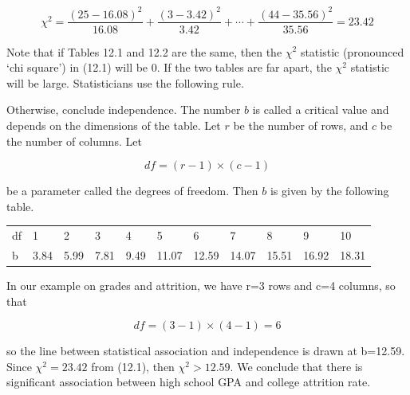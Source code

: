 \documentclass[11pt, chapterprefix=true]{scrbook}\usepackage[]{graphicx}\usepackage[]{color}
\begin{document}
\begin{equation*}
\chi^2 = \frac{(25-16.08)^2}{16.08} + \frac{(3-3.42)^2}{3.42} + \cdots + \frac{(44-35.56)^2}{35.56} = 23.42  
\end{equation*}

Note that if Tables 12.1 and 12.2 are the same, then the $\chi^2$ statistic (pronounced `chi square') in (12.1) will be 0.  If the two tables are far apart, the $\chi^2$ statistic will be large.  Statisticians use the following rule. 

\begin{center}
\end{center}

Otherwise, conclude independence.  The number $b$ is called a critical value and depends on the dimensions of the table.  Let $r$ be the number of rows, and $c$ be the number of columns.  Let

\begin{equation*}
df = (r - 1) \times (c - 1)
\end{equation*}

be a parameter called the degrees of freedom.  Then $b$ is given by the following table.

\begin{table}[ht]
\centering
\begin{tabular}{@{} lllllllllll @{}} \hline
df & 1&2&3&4&5&6&7&8&9&10 \\
b  & 3.84&5.99&7.81&9.49&11.07&12.59&14.07&15.51&16.92&18.31 \\ \hline
\end{tabular}
\end{table}

In our example on grades and attrition, we have r=3 rows and c=4 columns, so that

\begin{equation*}
df = (3 - 1) \times (4 - 1) = 6
\end{equation*}

so the line between statistical association and independence is drawn at b=12.59.  
Since $\chi^2 = 23.42$ from (12.1), then $\chi^2 > 12.59$.   We conclude that there is significant association between high school GPA and college attrition rate.
\end{document}
